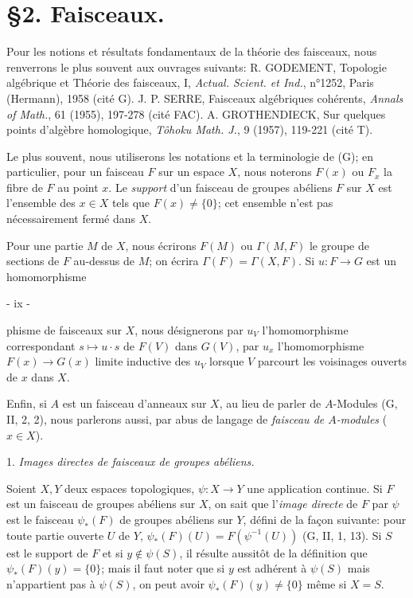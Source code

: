 \section*{§2. Faisceaux.}

Pour les notions et résultats fondamentaux de la théorie des faisceaux, nous renverrons le plus souvent aux ouvrages suivants: R. GODEMENT, Topologie algébrique et Théorie des faisceaux, I, \emph{Actual. Scient. et Ind.}, n°1252, Paris (Hermann), 1958 (cité G). J. P. SERRE, Faisceaux algébriques cohérents, \emph{Annals of Math.}, 61 (1955), 197-278 (cité FAC). A. GROTHENDIECK, Sur quelques points d'algèbre homologique, \emph{Tôhoku Math. J.}, 9 (1957), 119-221 (cité T).

Le plus souvent, nous utiliserons les notations et la terminologie de (G); en particulier, pour un faisceau $F$ sur un espace $X$, nous noterons $F(x)$ ou $F_x$ la fibre de $F$ au point $x$. Le \emph{support} d'un faisceau de groupes abéliens $F$ sur $X$ est l'ensemble des $x \in X$ tels que $F(x) \neq \{0\}$; cet ensemble n'est pas nécessairement fermé dans $X$.

Pour une partie $M$ de $X$, nous écrirons $F(M)$ ou $\Gamma(M, F)$ le groupe de sections de $F$ au-dessus de $M$; on écrira $\Gamma(F) = \Gamma(X, F)$. Si $u: F \to G$ est un homomorphisme

\newpage


- ix -

phisme de faisceaux sur $X$, nous désignerons par $u_V$ l'homomorphisme correspondant $s \mapsto u \cdot s$ de $F(V)$ dans $G(V)$, par $u_x$ l'homomorphisme $F(x) \to G(x)$ limite inductive des $u_V$ lorsque $V$ parcourt les voisinages ouverts de $x$ dans $X$.

Enfin, si $A$ est un faisceau d'anneaux sur $X$, au lieu de parler de $A$-Modules (G, II, 2, 2), nous parlerons aussi, par abus de langage de \emph{faisceau de $A$-modules} ($x \in X$).

1. \emph{Images directes de faisceaux de groupes abéliens.}

Soient $X, Y$ deux espaces topologiques, $\psi: X \to Y$ une application continue. 
Si $F$ est un faisceau de groupes abéliens sur $X$, on sait que l'\emph{image directe} de $F$ par $\psi$ est le faisceau $\psi_*(F)$ de groupes abéliens sur $Y$, défini de la façon suivante: pour toute partie ouverte $U$ de $Y$, $\psi_*(F)(U) = F(\psi^{-1}(U))$ (G, II, 1, 13). 
Si $S$ est le support de $F$ et si $y \notin \psi(S)$, il résulte aussitôt de la définition que $\psi_*(F)(y) = \{0\}$; mais il faut noter que si $y$ est adhérent à $\psi(S)$ mais n'appartient pas à $\psi(S)$, on peut avoir $\psi_*(F)(y) \neq \{0\}$ même si $X = S$.

